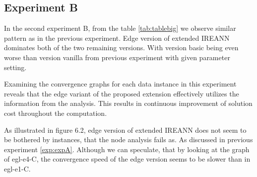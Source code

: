 \documentclass[twoside]{ctuthesis}
\theoremstyle{plain}
\theoremstyle{definition}
\theoremstyle{note}
\begin{document}
\subsection{Experiment B}


In the second experiment B, from the table \ref{tab:tablebig} we observe similar pattern as in the previous experiment. Edge version of extended IREANN dominates both of the two remaining versions. With version basic being even worse than version vanilla from previous experiment with given parameter setting.

Examining the convergence graphs for each data instance in this experiment reveals that the edge variant of the proposed extension effectively utilizes the information from the analysis. This results in continuous improvement of solution cost throughout the computation.

As illustrated in figure 6.2, edge version of extended IREANN does not seem to be bothered by instances, that the node analysis fails as. As discussed in previous experiment \ref{exp:expA}. Although we can speculate, that by looking at the graph of egl-e4-C, the convergence speed of the edge version seems to be slower than in egl-e1-C.
\end{document}
